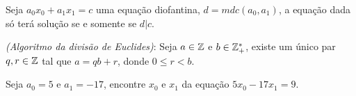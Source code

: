 	\begin{teorema}
	Seja $a_0x_0 + a_1x_1 = c$ uma equação diofantina, $d = mdc(a_0, a_1)$, a equação dada só terá solução se e somente se $d | c$.
	\end{teorema}

	\begin{teorema}
	\textit{(Algoritmo da divisão de Euclides)}: Seja $a \in \mathbb{Z}$ e $b \in \mathbb{Z}_{+}^{*}$, existe um único par $q, r \in \mathbb{Z}$ tal que $a = qb + r$, donde $0 \leq r < b$.
	\end{teorema}

	\begin{exemplo}
		Seja $a_0 = 5$ e $a_1 = -17$, encontre $x_0$ e $x_1$ da equação $5x_0 - 17x_1 = 9$. 
	\end{exemplo}

